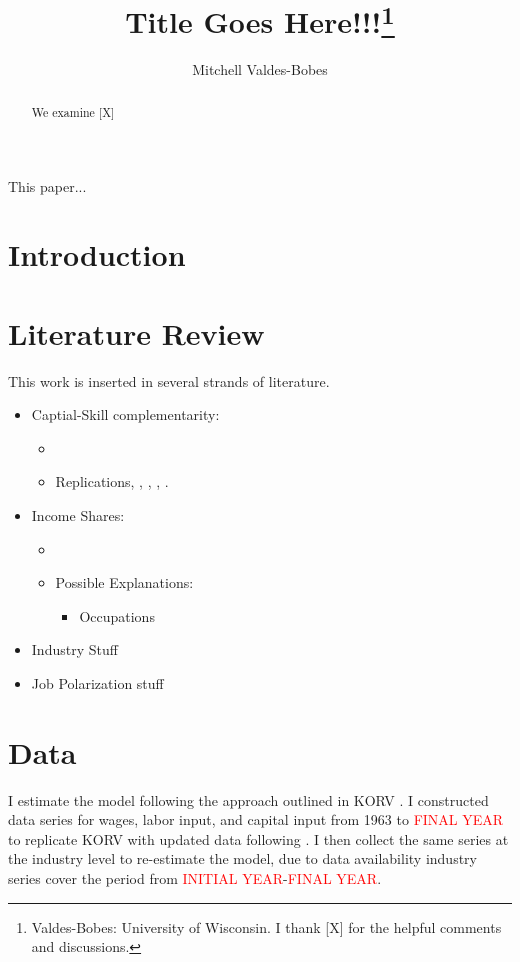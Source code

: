 \documentclass[12pt]{article}
\begin{document}
\sloppy
\title{Title Goes Here!!!\thanks{Valdes-Bobes: University of Wisconsin.
 I thank [X] for the helpful comments and discussions.}}
\author{Mitchell Valdes-Bobes}
\maketitle
\begin{abstract}
 We examine [X]
\end{abstract}
\thispagestyle{empty}

\pagebreak{}
This paper... 



\section{Introduction}\label{sec:introduction}

\section{Literature Review}\label{sec:literature_review}
This work is inserted in several strands of literature.
\begin{itemize}
 \item Captial-Skill complementarity:
 \begin{itemize}
 \item \citet{krusell2000capital}
 \item Replications, \citet{ohanian2021revisiting}, \citet{polgreen2008capital}, \citet{maliar2020capital}, \citet{castex2022decline}.
 \end{itemize}
 \item Income Shares:
 \begin{itemize}
 \item \citet{karabarbounis2014global}
 \item Possible Explanations:
 \begin{itemize}
 \item Occupations \citet{orak2017capital}
 \end{itemize}
 \end{itemize}
 \item Industry Stuff \citet{haltiwanger2022industries}
 \item Job Polarization stuff \citet{song2019firming}
\end{itemize}
\pagebreak

\section{Data}\label{sec:data}
I estimate the model following the approach outlined in KORV \citet{krusell2000capital}. I constructed data series for wages, labor input, and capital input from 1963 to \textcolor{red}{FINAL YEAR} to replicate KORV with updated data following \citet{ohanian2021revisiting}. I then collect the same series at the industry level to re-estimate the model, due to data availability industry series cover the period from \textcolor{red}{INITIAL YEAR}-\textcolor{red}{FINAL YEAR}.
\end{document}
